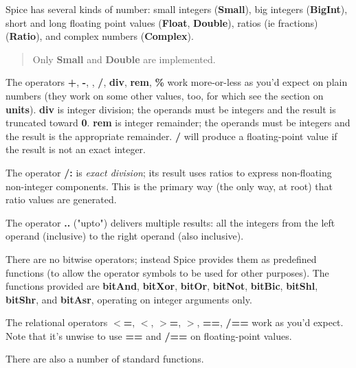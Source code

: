 \documentclass{report}
\begin{document}
Spice has several kinds of number: small integers ({\bf Small}), big integers
({\bf BigInt}), short and long floating point values ({\bf Float}, {\bf Double}),
ratios (ie fractions) ({\bf Ratio}), and complex numbers ({\bf Complex}).

\begin{quote}Only {\bf Small} and {\bf Double} are implemented.\end{quote}

The operators {\bf +}, {\bf -}, {\bf *}, {\bf /}, {\bf div}, {\bf rem}, {\bf \%} work more-or-less as
you'd expect on plain numbers (they work on some other values, too, for which
see the section on {\bf units}). {\bf div} is integer division; the operands must be
integers and the result is truncated toward {\bf 0}. {\bf rem} is integer remainder;
the operands must be integers and the result is the appropriate remainder. {\bf /}
will produce a floating-point value if the result is not an exact integer.

The operator {\bf /:} is {\em exact division}; its result uses ratios to express
non-floating non-integer components. This is the primary way (the only way, at
root) that ratio values are generated.

The operator {\bf ..} ("upto") delivers multiple results: all the integers
from the left operand (inclusive) to the right operand (also
inclusive).

There are no bitwise operators; instead Spice provides them as predefined
functions (to allow the operator symbols to be used for other purposes).
The functions provided are {\bf bitAnd}, {\bf bitXor}, {\bf bitOr}, {\bf bitNot}, {\bf bitBic},
{\bf bitShl}, {\bf bitShr}, and {\bf bitAsr}, operating on integer arguments only.

The relational operators {\bf $<$=}, {\bf $<$}, {\bf $>$=}, {\bf $>$}, {\bf ==}, {\bf /==} work as you'd
expect. Note that it's unwise to use {\bf ==} and {\bf /==} on floating-point values.

There are also a number of standard functions.
\end{document}
